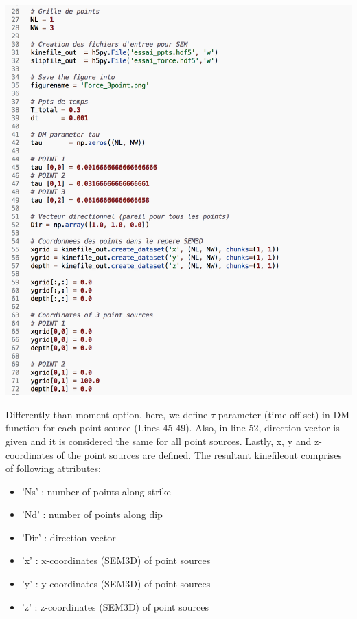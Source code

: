 \begin{center}
\leavevmode
\includegraphics[scale=0.45]{figures/convert-force.png} 
\label{con2} 
\vspace{1cm}
\end{center}


Differently than moment option, here, we define $\tau$ parameter (time off-set) in DM function for each point source (Lines 45-49). Also, in line 52, direction vector is given and it is considered the same for all point sources. Lastly, x, y and z-coordinates of the point sources are defined. The resultant kinefile\textunderscore out comprises of following attributes: \\


\begin{itemize}
\item 'Ns'      : number of points along strike \\
\item 'Nd'      : number of points along dip    \\
\item 'Dir'     : direction vector \\

\item 'x'       : x-coordinates (SEM3D) of point sources \\
\item 'y'       : y-coordinates (SEM3D) of point sources \\
\item 'z'       : z-coordinates (SEM3D) of point sources \\
\end{itemize}



